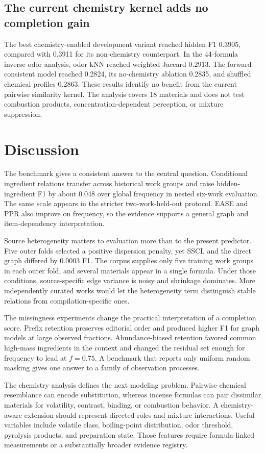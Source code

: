 \documentclass[11pt,a4paper]{article}
\newcommand{\SSCL}{\textsc{SSCL}}
\begin{document}
\subsection{The current chemistry kernel adds no completion gain}

The best chemistry-enabled development variant reached hidden F1 0.3905, compared with 0.3911 for its non-chemistry counterpart. In the 44-formula inverse-odor analysis, odor kNN reached weighted Jaccard 0.2913. The forward-consistent model reached 0.2824, its no-chemistry ablation 0.2835, and shuffled chemical profiles 0.2863. These results identify no benefit from the current pairwise similarity kernel. The analysis covers 18 materials and does not test combustion products, concentration-dependent perception, or mixture suppression.

\section{Discussion}

The benchmark gives a consistent answer to the central question. Conditional ingredient relations transfer across historical work groups and raise hidden-ingredient F1 by about 0.048 over global frequency in nested six-work evaluation. The same scale appears in the stricter two-work-held-out protocol. EASE and PPR also improve on frequency, so the evidence supports a general graph and item-dependency interpretation.

Source heterogeneity matters to evaluation more than to the present predictor. Five outer folds selected a positive dispersion penalty, yet \SSCL{} and the direct graph differed by 0.0003 F1. The corpus supplies only five training work groups in each outer fold, and several materials appear in a single formula. Under those conditions, source-specific edge variance is noisy and shrinkage dominates. More independently curated works would let the heterogeneity term distinguish stable relations from compilation-specific ones.

The missingness experiments change the practical interpretation of a completion score. Prefix retention preserves editorial order and produced higher F1 for graph models at large observed fractions. Abundance-biased retention favored common high-mass ingredients in the context and changed the residual set enough for frequency to lead at $f=0.75$. A benchmark that reports only uniform random masking gives one answer to a family of observation processes.

The chemistry analysis defines the next modeling problem. Pairwise chemical resemblance can encode substitution, whereas incense formulas can pair dissimilar materials for volatility, contrast, binding, or combustion behavior. A chemistry-aware extension should represent directed roles and mixture interactions. Useful variables include volatile class, boiling-point distribution, odor threshold, pyrolysis products, and preparation state. Those features require formula-linked measurements or a substantially broader evidence registry.
\end{document}
